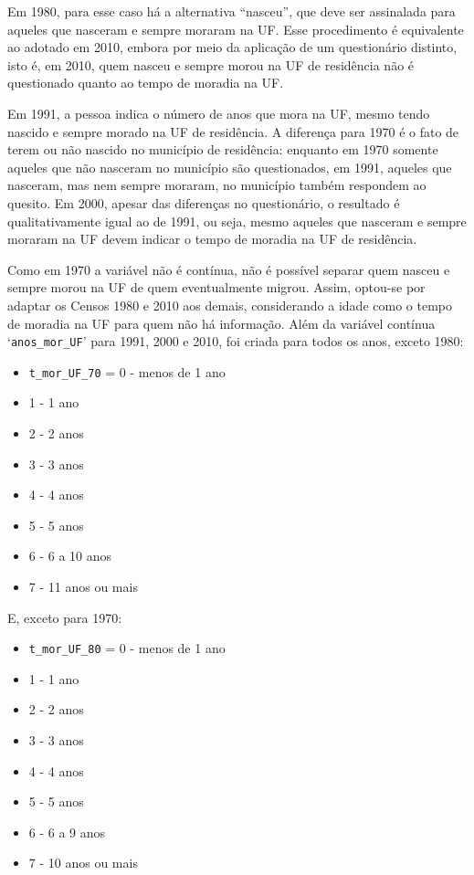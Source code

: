 \documentclass[12pt,a4paper]{article}
\newcommand{\vr}[1]{\texttt{#1}}
\begin{document}
Em 1980, para esse caso há a alternativa “nasceu”, que deve ser assinalada para aqueles que nasceram e sempre moraram na UF. Esse procedimento é equivalente ao adotado em 2010, embora por meio da aplicação de um questionário distinto, isto é, em 2010, quem nasceu e sempre morou na UF de residência não é questionado quanto ao tempo de moradia na UF.

Em 1991, a pessoa indica o número de anos que mora na UF, mesmo tendo nascido e sempre morado na UF de residência. A diferença para 1970 é o fato de terem ou não nascido no município de residência: enquanto em 1970 somente aqueles que não nasceram no município são questionados, em 1991, aqueles que nasceram, mas nem sempre moraram, no município também respondem ao quesito. Em 2000, apesar das diferenças no questionário, o resultado é qualitativamente igual ao de 1991, ou seja, mesmo aqueles que nasceram e sempre moraram na UF devem indicar o tempo de moradia na UF de residência.

Como em 1970 a variável não é contínua, não é possível separar quem nasceu e sempre morou na UF de quem eventualmente migrou. Assim, optou-se por adaptar os Censos 1980 e 2010 aos demais, considerando a idade como o tempo de moradia na UF para quem não há informação. Além da variável contínua ‘\vr{anos\_mor\_UF}’ para 1991, 2000 e 2010, foi criada para todos os anos, exceto 1980:
\begin{itemize}
  \item \vr{t\_mor\_UF\_70} = 0 - menos de 1 ano
  \item 1 - 1 ano
  \item 2 - 2 anos
  \item 3 - 3 anos
  \item 4 - 4 anos
  \item 5 - 5 anos
  \item 6 - 6 a 10 anos
  \item 7 - 11 anos ou mais
\end{itemize}

E, exceto para 1970:
\begin{itemize}
  \item \vr{t\_mor\_UF\_80} = 0 - menos de 1 ano
  \item 1 - 1 ano
  \item 2 - 2 anos
  \item 3 - 3 anos
  \item 4 - 4 anos
  \item 5 - 5 anos
  \item 6 - 6 a 9 anos
  \item 7 - 10 anos ou mais
\end{itemize}
\end{document}
